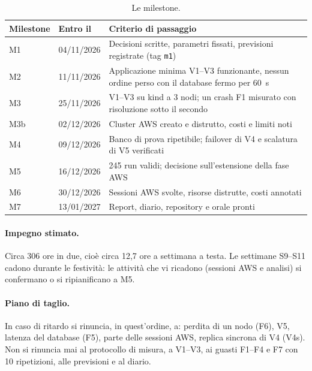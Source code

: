 \begin{table}[htbp]
\centering
\caption{Le milestone.}
\label{tab:milestone}
\begin{tabularx}{\linewidth}{@{}llL@{}}
\toprule
\textbf{Milestone} & \textbf{Entro il} & \textbf{Criterio di passaggio} \\
\midrule
M1 & 04/11/2026 & Decisioni scritte, parametri fissati, previsioni registrate (tag \texttt{m1}) \\
M2 & 11/11/2026 & Applicazione minima V1--V3 funzionante, nessun ordine perso con il database fermo per 60~s \\
M3 & 25/11/2026 & V1--V3 su kind a 3 nodi; un crash F1 misurato con risoluzione sotto il secondo \\
M3b & 02/12/2026 & Cluster AWS creato e distrutto, costi e limiti noti \\
M4 & 09/12/2026 & Banco di prova ripetibile; failover di V4 e scalatura di V5 verificati \\
M5 & 16/12/2026 & 245 run validi; decisione sull'estensione della fase AWS \\
M6 & 30/12/2026 & Sessioni AWS svolte, risorse distrutte, costi annotati \\
M7 & 13/01/2027 & Report, diario, repository e orale pronti \\
\bottomrule
\end{tabularx}
\end{table}

\paragraph{Impegno stimato.} Circa 306 ore in due, cioè circa 12,7 ore a settimana a testa. Le settimane S9--S11 cadono durante le festività: le attività che vi ricadono (sessioni AWS e analisi) si confermano o si ripianificano a M5.

\paragraph{Piano di taglio.} In caso di ritardo si rinuncia, in quest'ordine, a: perdita di un nodo (F6), V5, latenza del database (F5), parte delle sessioni AWS, replica sincrona di V4 (V4s). Non si rinuncia mai al protocollo di misura, a V1--V3, ai guasti F1--F4 e F7 con 10 ripetizioni, alle previsioni e al diario.

